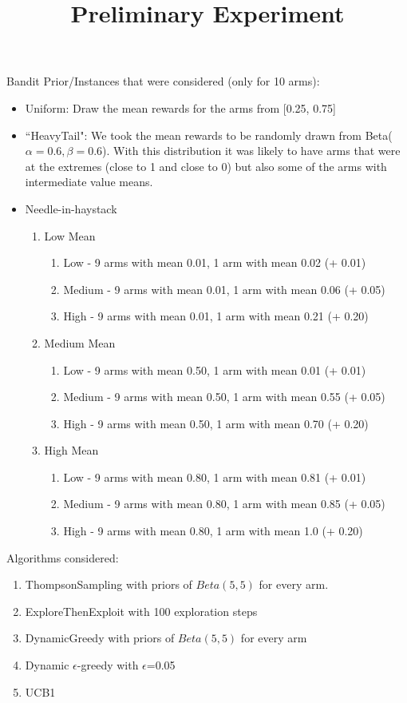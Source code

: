 \documentclass[11pt,letterpaper]{article}
\begin{document}
 

\title{Preliminary Experiment}
\maketitle

Bandit Prior/Instances that were considered (only for 10 arms):
\begin{itemize}
\item Uniform: Draw the mean rewards for the arms from [0.25, 0.75]
\item ``HeavyTail": We took the mean rewards to be randomly drawn from Beta($\alpha=0.6,\beta=0.6$). With this distribution it was likely to have arms that were at the extremes (close to 1 and close to 0) but also some of the arms with intermediate value means.
\item Needle-in-haystack
\begin{enumerate}
\item Low Mean
\begin{enumerate}
\item Low - 9 arms with mean 0.01, 1 arm with mean 0.02 (+ 0.01)
\item Medium - 9 arms with mean 0.01, 1 arm with mean 0.06 (+ 0.05)
\item High - 9 arms with mean 0.01, 1 arm with mean 0.21 (+ 0.20)
\end{enumerate}
\item Medium Mean
\begin{enumerate}
\item Low - 9 arms with mean 0.50, 1 arm with mean 0.01 (+ 0.01)
\item Medium - 9 arms with mean 0.50, 1 arm with mean 0.55 (+ 0.05)
\item High - 9 arms with mean 0.50, 1 arm with mean 0.70 (+ 0.20)
\end{enumerate}
\item High Mean
\begin{enumerate}
\item Low - 9 arms with mean 0.80, 1 arm with mean 0.81 (+ 0.01)
\item Medium - 9 arms with mean 0.80, 1 arm with mean 0.85 (+ 0.05)
\item High - 9 arms with mean 0.80, 1 arm with mean 1.0 (+ 0.20)
\end{enumerate}
\end{enumerate}
\end{itemize}

Algorithms considered:
\begin{enumerate}
\item ThompsonSampling with priors of $Beta(5, 5)$ for every arm.
\item ExploreThenExploit with 100 exploration steps
\item DynamicGreedy with priors of $Beta(5, 5)$ for every arm
\item Dynamic $\epsilon$-greedy with $\epsilon$=0.05
\item UCB1
\end{enumerate}
\end{document}
